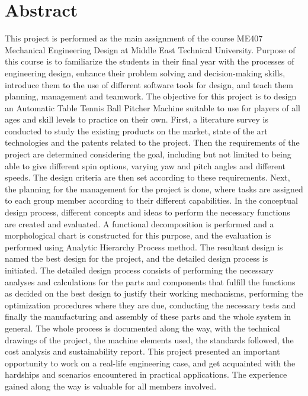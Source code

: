 \documentclass[12pt]{report}
\begin{document}
\chapter{Abstract}
This project is performed as the main assignment of the course ME407 Mechanical Engineering Design at Middle East Technical University. Purpose of this course is to familiarize the students in their final year with the processes of engineering design, enhance their problem solving and decision-making skills, introduce them to the use of different software tools for design, and teach them planning, management and teamwork. The objective for this project is to design an Automatic Table Tennis Ball Pitcher Machine suitable to use for players of all ages and skill levels to practice on their own. First, a literature survey is conducted to study the existing products on the market, state of the art technologies and the patents related to the project. Then the requirements of the project are determined considering the goal, including but not limited to being able to give different spin options, varying yaw and pitch angles and different speeds. The design criteria are then set according to these requirements. Next, the planning for the management for the project is done, where tasks are assigned to each group member according to their different capabilities. In the conceptual design process, different concepts and ideas to perform the necessary functions are created and evaluated. A functional decomposition is performed and a morphological chart is constructed for this purpose, and the evaluation is performed using Analytic Hierarchy Process method. The resultant design is named the best design for the project, and the detailed design process is initiated. The detailed design process consists of performing the necessary analyses and calculations for the parts and components that fulfill the functions as decided on the best design to justify their working mechanisms, performing the optimization procedures where they are due, conducting the necessary tests and finally the manufacturing and assembly of these parts and the whole system in general. The whole process is documented along the way, with the technical drawings of the project, the machine elements used, the standards followed, the cost analysis and sustainability report. This project presented an important opportunity to work on a real-life engineering case, and get acquainted with the hardships and scenarios encountered in practical applications. The experience gained along the way is valuable for all members involved.
\end{document}

